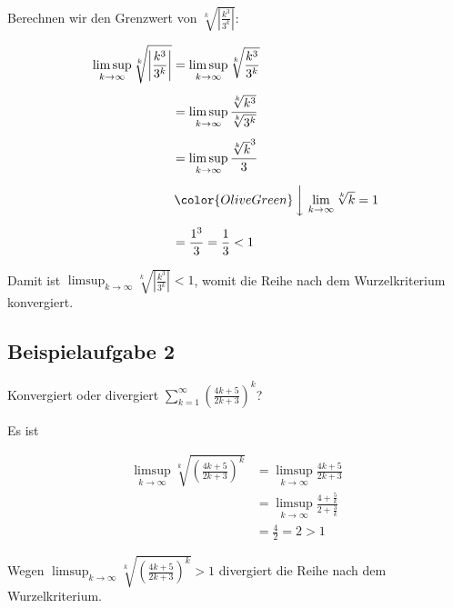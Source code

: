 \documentclass[fontsize=9pt,
               parskip=half-,
               DIV=14,
               listof=chapterentry,
               tocflat]{scrbook}
\begin{document}
\begin{solution*}
Berechnen wir den Grenzwert von ${\sqrt[{k}]{\left|{\tfrac {k^{3}}{3^{k}}}\right|}}$:

\begin{align*}
\limsup _{k\to \infty }{\sqrt[{k}]{\left|{\frac {k^{3}}{3^{k}}}\right|}}&=\limsup _{k\to \infty }{\sqrt[{k}]{\frac {k^{3}}{3^{k}}}}\\[0.5em]&=\limsup _{k\to \infty }{\frac {\sqrt[{k}]{k^{3}}}{\sqrt[{k}]{3^{k}}}}\\[0.5em]&=\limsup _{k\to \infty }{\frac {{\sqrt[{k}]{k}}^{3}}{3}}\\[0.5em]&\,{\color {OliveGreen}\left\downarrow \ \lim _{k\to \infty }{\sqrt[{k}]{k}}=1\right.}\\[0.5em]&={\frac {1^{3}}{3}}={\frac {1}{3}}<1
\end{align*}

Damit ist $\limsup _{k\to \infty }{\sqrt[{k}]{\left|{\tfrac {k^{3}}{3^{k}}}\right|}}<1$, womit die Reihe nach dem Wurzelkriterium konvergiert.

\end{solution*}

\subsection{Beispielaufgabe 2}

\begin{exercise*}
Konvergiert oder divergiert $\sum _{k=1}^{\infty }\left({\frac {4k+5}{2k+3}}\right)^{k}$?

\end{exercise*}

\begin{solution*}
Es ist

\begin{align*}
\limsup _{k\to \infty }{\sqrt[{k}]{\left({\frac {4k+5}{2k+3}}\right)^{k}}}&=\limsup _{k\to \infty }{\frac {4k+5}{2k+3}}\\[0.5em]&=\limsup _{k\to \infty }{\frac {4+{\frac {5}{k}}}{2+{\frac {3}{k}}}}\\[0.5em]&={\frac {4}{2}}=2>1
\end{align*}

Wegen $\limsup _{k\to \infty }{\sqrt[{k}]{\left({\frac {4k+5}{2k+3}}\right)^{k}}}>1$ divergiert die Reihe nach dem Wurzelkriterium.

\end{solution*}


\end{document}

